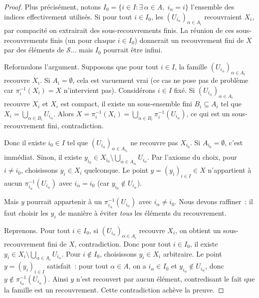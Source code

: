 \documentclass[12pt,a4paper,openany]{book}
\theoremstyle{definition}
\theoremstyle{cours}
\theoremstyle{coursnormal}
\begin{document}
\begin{proof}
  Plus précisément, notons $I_0=\{i\in I:\exists\,\alpha\in A,\;i_\alpha=i\}$
  l'ensemble des indices effectivement utilisés. Si pour tout $i\in I_0$, les
  $(U_{i_\alpha})_{\alpha\in A_i}$ recouvraient $X_i$, par compacité on
  extrairait des sous-recouvrements finis. La réunion de ces sous-recouvrements
  finis (un pour chaque $i\in I_0$) donnerait un recouvrement fini de $X$ par
  des éléments de $\mathcal{S}$... mais $I_0$ pourrait être infini.

  Reformulons l'argument. Supposons que pour tout $i\in I$, la famille
  $(U_{i_\alpha})_{\alpha\in A_i}$ recouvre $X_i$. Si $A_i=\emptyset$, cela
  est vacuement vrai (ce cas ne pose pas de problème car $\pi_i^{-1}(X_i)=X$
  n'intervient pas). Considérons $i\in I$ fixé. Si $(U_{i_\alpha})_{\alpha\in
  A_i}$ recouvre $X_i$ et $X_i$ est compact, il existe un sous-ensemble fini
  $B_i\subseteq A_i$ tel que $X_i=\bigcup_{\alpha\in B_i}U_{i_\alpha}$. Alors
  $X=\pi_i^{-1}(X_i)=\bigcup_{\alpha\in B_i}\pi_i^{-1}(U_{i_\alpha})$, ce
  qui est un sous-recouvrement fini, contradiction.

  Donc il existe $i_0\in I$ tel que $(U_{i_\alpha})_{\alpha\in A_{i_0}}$ ne
  recouvre pas $X_{i_0}$. Si $A_{i_0}=\emptyset$, c'est immédiat. Sinon, il
  existe $y_{i_0}\in X_{i_0}\setminus\bigcup_{\alpha\in A_{i_0}}U_{i_\alpha}$.
  Par l'axiome du choix, pour $i\neq i_0$, choisissons $y_i\in X_i$ quelconque.
  Le point $y=(y_i)_{i\in I}\in X$ n'appartient à aucun
  $\pi_{i_\alpha}^{-1}(U_{i_\alpha})$ avec $i_\alpha=i_0$ (car
  $y_{i_0}\notin U_{i_\alpha}$).

  Mais $y$ pourrait appartenir à un $\pi_{i_\alpha}^{-1}(U_{i_\alpha})$ avec
  $i_\alpha\neq i_0$. Nous devons raffiner~: il faut choisir les $y_i$ de
  manière à éviter \emph{tous} les éléments du recouvrement.

  Reprenons. Pour tout $i\in I_0$, si $(U_{i_\alpha})_{\alpha\in A_i}$
  recouvre $X_i$, on obtient un sous-recouvrement fini de $X$, contradiction.
  Donc pour tout $i\in I_0$, il existe
  $y_i\in X_i\setminus\bigcup_{\alpha\in A_i}U_{i_\alpha}$. Pour $i\notin
  I_0$, choisissons $y_i\in X_i$ arbitraire. Le point $y=(y_i)_{i\in I}$
  satisfait~: pour tout $\alpha\in A$, on a $i_\alpha\in I_0$ et
  $y_{i_\alpha}\notin U_{i_\alpha}$, donc $y\notin\pi_{i_\alpha}^{-1}
  (U_{i_\alpha})$. Ainsi $y$ n'est recouvert par aucun élément, contredisant
  le fait que la famille est un recouvrement. Cette contradiction achève la
  preuve.
\end{proof}
\end{document}
